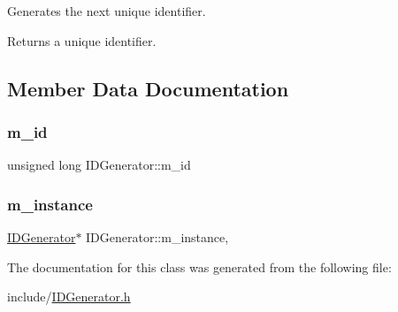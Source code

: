 Generates the next unique identifier. \begin{DoxyReturn}{Returns}
a unique identifier. 
\end{DoxyReturn}


\subsection{Member Data Documentation}
\mbox{\label{class_i_d_generator_ad0400380525f694b23ff675f4f170893}} 
\subsubsection{\texorpdfstring{m\_id}{m\_id}}
{\footnotesize\ttfamily unsigned long I\+D\+Generator\+::m\+\_\+id\hspace{0.3cm}{\ttfamily [private]}}

\mbox{\label{class_i_d_generator_a316bacdda67f4cf9bf73fcbd9bf94245}} 
\subsubsection{\texorpdfstring{m\_instance}{m\_instance}}
{\footnotesize\ttfamily \mbox{\hyperlink{class_i_d_generator}{I\+D\+Generator}}$\ast$ I\+D\+Generator\+::m\+\_\+instance\hspace{0.3cm}{\ttfamily [static]}, {\ttfamily [private]}}



The documentation for this class was generated from the following file\+:\begin{DoxyCompactItemize}
\item 
include/\mbox{\hyperlink{_i_d_generator_8h}{I\+D\+Generator.\+h}}\end{DoxyCompactItemize}
